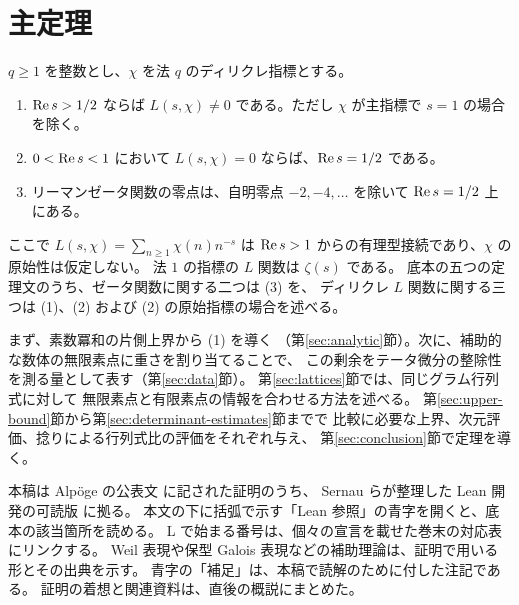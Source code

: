 \section{主定理}

\begin{theorem}\label{thm:grh}
\(q\ge 1\) を整数とし、\(\chi\) を法 \(q\) のディリクレ指標とする。
\begin{enumerate}
\item \(\operatorname{Re} s>1/2\) ならば \(L(s,\chi)\ne0\) である。ただし \(\chi\) が主指標で
      \(s=1\) の場合を除く。
\item \(0<\operatorname{Re} s<1\) において \(L(s,\chi)=0\) ならば、\(\operatorname{Re} s=1/2\) である。
\item リーマンゼータ関数の零点は、自明零点 \(-2,-4,\ldots\) を除いて
      \(\operatorname{Re} s=1/2\) 上にある。
\end{enumerate}
\end{theorem}

\noindent
ここで \(L(s,\chi)=\sum_{n\ge1}\chi(n)n^{-s}\) は
\(\operatorname{Re} s>1\) からの有理型接続であり、\(\chi\) の原始性は仮定しない。
法 \(1\) の指標の \(L\) 関数は \(\zeta(s)\) である。
底本の五つの定理文のうち、ゼータ関数に関する二つは (3) を、
ディリクレ \(L\) 関数に関する三つは (1)、(2) および (2) の原始指標の場合を述べる。

まず、素数冪和の片側上界から (1) を導く
（第\ref{sec:analytic}節）。次に、補助的な数体の無限素点に重さを割り当てることで、
この剰余をテータ微分の整除性を測る量として表す（第\ref{sec:data}節）。
第\ref{sec:lattices}節では、同じグラム行列式に対して
無限素点と有限素点の情報を合わせる方法を述べる。
第\ref{sec:upper-bound}節から第\ref{sec:determinant-estimates}節までで
比較に必要な上界、次元評価、捻りによる行列式比の評価をそれぞれ与え、
第\ref{sec:conclusion}節で定理を導く。

本稿は Alpöge の公表文 \cite{alpoege} に記された証明のうち、
Sernau らが整理した Lean 開発の可読版 \cite{grh-source} に拠る。
本文の下に括弧で示す「Lean 参照」の青字を開くと、底本の該当箇所を読める。
L で始まる番号は、個々の宣言を載せた巻末の対応表にリンクする。
Weil 表現や保型 Galois 表現などの補助理論は、証明で用いる形とその出典を示す。
青字の「補足」は、本稿で読解のために付した注記である。
証明の着想と関連資料は、直後の概説にまとめた。
